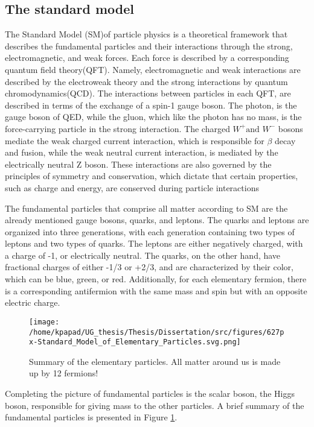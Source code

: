 \subsection{The standard model}
\label{sec:org8632faf}

The Standard Model (SM)of particle physics is a theoretical framework that describes the fundamental particles and their interactions through the strong, electromagnetic, and weak forces. Each force is described by a corresponding quantum field theory(QFT). Namely, electromagnetic and weak interactions are described by the electroweak theory and the strong interactions by quantum chromodynamics(QCD). The interactions between particles in each QFT, are described in terms of the exchange of a spin-1 gauge boson. The photon, is the gauge boson of QED, while the gluon, which like the photon has no mass, is the force-carrying particle in the strong interaction. The charged \(W^{+} \text{and }W^{-}\) bosons mediate the weak charged current interaction, which is responsible for \(\beta\) decay and fusion, while the weak neutral current interaction, is mediated by the electrically neutral Z boson. These interactions are also governed by the principles of symmetry and conservation, which dictate that certain properties, such as charge and energy, are conserved during particle interactions

The fundamental particles that comprise all matter according to SM are the already mentioned gauge bosons, quarks, and leptons. The quarks and leptons are organized into three generations, with each generation containing two types of leptons and two types of quarks. The leptons are either negatively charged, with a charge of -1, or electrically neutral. The quarks, on the other hand, have fractional charges of either -1/3 or +2/3, and are characterized by their color, which can be blue, green, or red. Additionally, for each elementary fermion, there is a corresponding antifermion with the same mass and spin but with an opposite electric charge.
\begin{figure}[ht]
\centering
\texttt{[image: /home/kpapad/UG\_thesis/Thesis/Dissertation/src/figures/627px-Standard\_Model\_of\_Elementary\_Particles.svg.png]}
\caption{Summary of the elementary particles. All matter around us is made up by 12 fermions!}
\label{fig:particles}
\end{figure}


Completing the picture of fundamental particles is the scalar boson, the Higgs boson, responsible for giving mass to the other particles. A brief summary of the fundamental particles is presented in Figure \ref{fig:particles}.

